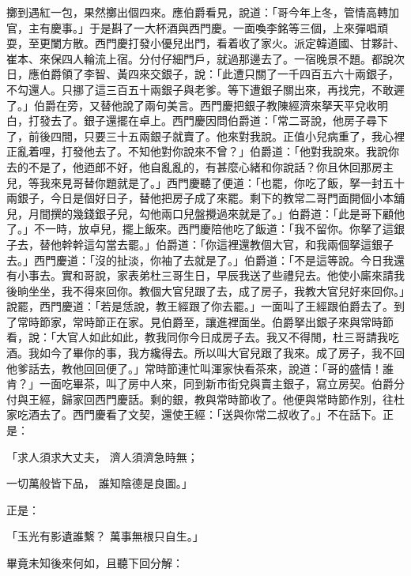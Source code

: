 擲到遇紅一包，果然擲出個四來。應伯爵看見，說道：「哥今年上冬，管情高轉加官，主有慶事。」于是斟了一大杯酒與西門慶。一面喚李銘等三個，上來彈唱頑耍，至更闌方散。西門慶打發小優兒出門，看着收了家火。派定韓道國、甘夥計、崔本、來保四人輪流上宿。分付仔細門戶，就過那邊去了。一宿晚景不題。都說次日，應伯爵領了李智、黃四來交銀子，說：「此遭只關了一千四百五六十兩銀子，不勾還人。只挪了這三百五十兩銀子與老爹。等下遭銀子關出來，再找完，不敢遲了。」伯爵在旁，又替他說了兩句美言。西門慶把銀子教陳經濟來拏天平兌收明白，打發去了。銀子還擺在卓上。西門慶因問伯爵道：「常二哥說，他房子尋下了，前後四間，只要三十五兩銀子就賣了。他來對我說。正值小兒病重了，我心裡正亂着哩，打發他去了。不知他對你說來不曾？」伯爵道：「他對我說來。我說你去的不是了，他迺郎不好，他自亂亂的，有甚麼心緒和你說話？你且休回那房主兒，等我來見哥替你題就是了。」西門慶聽了便道：「也罷，你吃了飯，拏一封五十兩銀子，今日是個好日子，替他把房子成了來罷。剩下的教常二哥門面開個小本舖兒，月間撰的幾錢銀子兒，勾他兩口兒盤攪過來就是了。」伯爵道：「此是哥下顧他了。」不一時，放卓兒，擺上飯來。西門慶陪他吃了飯道：「我不留你。你拏了這銀子去，替他幹幹這勾當去罷。」伯爵道：「你這裡還教個大官，和我兩個拏這銀子去。」西門慶道：「沒的扯淡，你袖了去就是了。」伯爵道：「不是這等說。今日我還有小事去。實和哥說，家表弟杜三哥生日，早辰我送了些禮兒去。他使小廝來請我後晌坐坐，我不得來回你。教個大官兒跟了去，成了房子，我教大官兒好來回你。」說罷，西門慶道：「若是恁說，教王經跟了你去罷。」一面叫了王經跟伯爵去了。到了常時節家，常時節正在家。見伯爵至，讓進裡面坐。伯爵拏出銀子來與常時節看，說：「大官人如此如此，教我同你今日成房子去。我又不得閒，杜三哥請我吃酒。我如今了畢你的事，我方纔得去。所以叫大官兒跟了我來。成了房子，我不回他爹話去，教他回回便了。」常時節連忙叫渾家快看茶來，說道：「哥的盛情！誰肯？」一面吃畢茶，叫了房中人來，同到新市街兌與賣主銀子，寫立房契。伯爵分付與王經，歸家回西門慶話。剩的銀，教與常時節收了。他便與常時節作別，往杜家吃酒去了。西門慶看了文契，還使王經：「送與你常二叔收了。」不在話下。正是：

「求人須求大丈夫，  濟人須濟急時無；

一切萬般皆下品，  誰知陰德是良圖。」

正是：

「玉光有影遺誰繫？  萬事無根只自生。」

畢竟未知後來何如，且聽下回分解：
